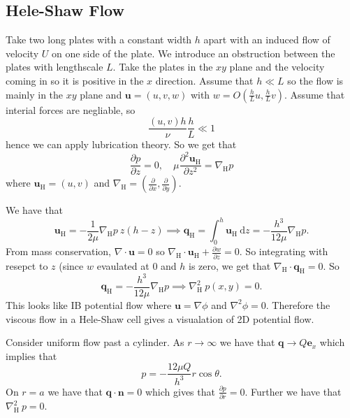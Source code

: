 \documentclass{article}
\begin{document}
\subsection{Hele-Shaw Flow}
Take two long plates with a constant width $ h $ apart with an induced flow of velocity $ U $ on one side of the plate. We introduce an obstruction between the plates with lengthscale $ L $. Take the plates in the $ xy $ plane and the velocity coming in so it is positive in the $ x $ direction. Assume that $ h\ll L $ so the flow is mainly in the $ xy $ plane and $ \mathbf u = (u,v,w) $ with $ w = O\left(\frac{h}L u , \frac hLv\right) $. Assume that interial forces are negliable, so 
\[
	\frac{(u,v)h}{\nu} \frac hL \ll1
\]
hence we can apply lubrication theory. So we get that
\[
	\frac{\partial p}{\partial z} = 0,\quad \mu \frac{\partial^2 \mathbf u_{\mathrm H}}{\partial z^2} = \nabla_{\mathrm H} p
\]
where $ \mathbf u_{\mathrm H} = (u,v) $ and $ \nabla_{\mathrm H} = \left(\frac{\partial}{\partial x}, \frac\partial{\partial y}\right) $.
\par
We have that
\[
	\mathbf u_{\mathrm H} = -\frac 1{2\mu} \nabla_{\mathrm H} p \ z(h-z) \implies \mathbf q_{\mathrm H} = \int_0^h \mathbf u_{\mathrm H} \ \mathrm dz = - \frac{h^3}{12\mu} \nabla_{\mathrm H} p.
\]
From mass conservation, $ \nabla\cdot\mathbf u = 0 $ so $ \nabla_{\mathrm H} \cdot \mathbf u_{\mathrm H} + \frac{\partial w}{\partial z} = 0 $. So integrating with resepct to $ z $ (since $ w $ evaulated at $ 0 $ and $ h $ is zero, we get that $ \nabla_{\mathrm H} \cdot \mathbf q_{\mathrm H} = 0 $. So 
\[
	\mathbf q_{\mathrm H} =- \frac{h^3}{12\mu} \nabla_{\mathrm H} p \implies \nabla^2 _{\mathrm H}\  p (x,y) = 0.
\]
This looks like IB potential flow where $ \mathbf u = \nabla \phi $ and $ \nabla^2 \phi = 0 $. Therefore the viscous flow in a Hele-Shaw cell gives a visualation of 2D potential flow.
\begin{example}
  Consider uniform flow past a cylinder. As $ r\to\infty $ we have that $ \mathbf q \to Q\mathbf e_x $ which implies that
  \[
     p = -\frac{12 \mu Q}{h^3} r \cos\theta.
  \]
  On $ r=a $ we have that $ \mathbf q \cdot \mathbf n = 0 $ which gives that $ \frac{\partial p}{\partial r} = 0 $. Further we have that $ \nabla^2_{\mathrm H}\ p = 0 $.
\end{example}
\end{document}
